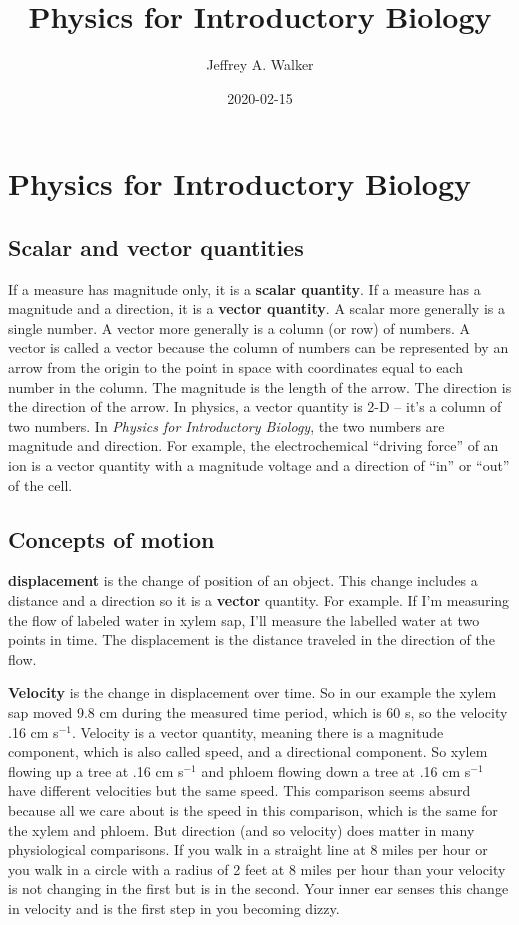 \documentclass[]{book}
\title{Physics for Introductory Biology}
\author{Jeffrey A. Walker}
\date{2020-02-15}
\begin{document}
\maketitle

{
\setcounter{tocdepth}{1}
\tableofcontents
}
\chapter{Physics for Introductory
Biology}\label{physics-for-introductory-biology}

\section{Scalar and vector
quantities}\label{scalar-and-vector-quantities}

If a measure has magnitude only, it is a \textbf{scalar quantity}. If a
measure has a magnitude and a direction, it is a \textbf{vector
quantity}. A scalar more generally is a single number. A vector more
generally is a column (or row) of numbers. A vector is called a vector
because the column of numbers can be represented by an arrow from the
origin to the point in space with coordinates equal to each number in
the column. The magnitude is the length of the arrow. The direction is
the direction of the arrow. In physics, a vector quantity is 2-D -- it's
a column of two numbers. In \emph{Physics for Introductory Biology}, the
two numbers are magnitude and direction. For example, the
electrochemical ``driving force'' of an ion is a vector quantity with a
magnitude voltage and a direction of ``in'' or ``out'' of the cell.

\section{Concepts of motion}\label{concepts-of-motion}

\textbf{displacement} is the change of position of an object. This
change includes a distance and a direction so it is a \textbf{vector}
quantity. For example. If I'm measuring the flow of labeled water in
xylem sap, I'll measure the labelled water at two points in time. The
displacement is the distance traveled in the direction of the flow.

\textbf{Velocity} is the change in displacement over time. So in our
example the xylem sap moved 9.8 cm during the measured time period,
which is 60 s, so the velocity .16 cm s\(^{-1}\). Velocity is a vector
quantity, meaning there is a magnitude component, which is also called
speed, and a directional component. So xylem flowing up a tree at .16 cm
s\(^{-1}\) and phloem flowing down a tree at .16 cm s\(^{-1}\) have
different velocities but the same speed. This comparison seems absurd
because all we care about is the speed in this comparison, which is the
same for the xylem and phloem. But direction (and so velocity) does
matter in many physiological comparisons. If you walk in a straight line
at 8 miles per hour or you walk in a circle with a radius of 2 feet at 8
miles per hour than your velocity is not changing in the first but is in
the second. Your inner ear senses this change in velocity and is the
first step in you becoming dizzy.
\end{document}

